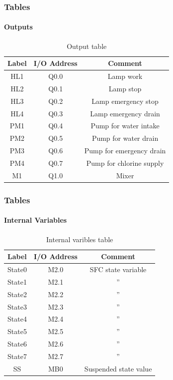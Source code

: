 \documentclass[12pt]{beamer}
\begin{document}
\begin{frame}
\frametitle{Tables}
\framesubtitle{Outputs}
\begin{table}[]
    \centering
    \begin{tabular}{|c|c|c|}
    \hline
       Label & I/O Address & Comment \\
       \hline
       \hline
       HL1 & Q0.0 & Lamp work\\
       \hline
       HL2 & Q0.1 & Lamp stop\\
       \hline
       HL3 & Q0.2 & Lamp emergency stop\\
       \hline
       HL4 & Q0.3 & Lamp emergency drain\\
       \hline
       PM1 & Q0.4 & Pump for water intake\\
       \hline
       PM2 & Q0.5 & Pump for water drain\\
       \hline
       PM3 & Q0.6 & Pump for emergency drain\\
       \hline
       PM4 & Q0.7 & Pump for chlorine supply\\
       \hline
       M1 & Q1.0 & Mixer\\
       \hline
    \end{tabular}
    \caption{Output table}
    \label{tab:outputs}
\end{table}
\end{frame}

\begin{frame}
\frametitle{Tables}
\framesubtitle{Internal Variables}
\begin{table}[]
    \centering
    \begin{tabular}{|c|c|c|}
    \hline
       Label & I/O Address & Comment\\
       \hline
       \hline
       State0 & M2.0 & SFC state variable\\
       \hline
       State1 & M2.1 & ''\\
       \hline
       State2 & M2.2 & ''\\
       \hline
       State3 & M2.3 & ''\\
       \hline
       State4 & M2.4 & ''\\
       \hline
       State5 & M2.5 & ''\\
       \hline
       State6 & M2.6 & ''\\
       \hline
       State7 & M2.7 & ''\\
       \hline
       SS & MB0 & Suspended state value\\
       \hline
    \end{tabular}
    \caption{Internal varibles table}
    \label{tab:internal_variables}
\end{table}
\end{frame}
\end{document}
